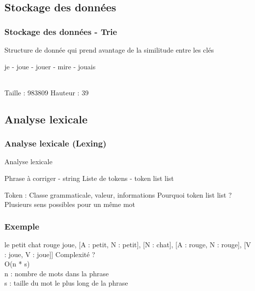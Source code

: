 \documentclass{beamer}
\begin{document}
\subsection{Stockage des données}
\begin{frame}
   \frametitle{Stockage des données - Trie}
   Structure de donnée qui prend avantage de la similitude entre les clés\\
   \begin{center}
   je - joue - jouer - mire - jouais\\
   \end{center}
   \centering
   \\
   Taille : 983809 \; \; Hauteur : 39
\end{frame}

\subsection{Analyse lexicale}
\begin{frame}
   \frametitle{Analyse lexicale (Lexing)}
   \begin{algorithm}[H]
      \caption{Analyse lexicale}
      \begin{algorithmic}
         \Require Phrase à corriger - string
         \Ensure Liste de tokens - token list list
      \end{algorithmic}
   \end{algorithm}
   Token : Classe grammaticale, valeur, informations\bigbreak
   Pourquoi token list list ?\\
   Plusieurs sens possibles pour un même mot
\end{frame}

\begin{frame}
   \frametitle{Exemple}
   le petit chat rouge joue\bigbreak
   [[D : le, Ov : le],
    [A : petit, N : petit],
    [N : chat],
    [A : rouge, N : rouge],
    [V : joue, V : joue]]
   \bigbreak
   Complexité ?\\
   O(n * s)\\
   n : nombre de mots dans la phrase\\
   s : taille du mot le plus long de la phrase
\end{frame}
\end{document}
